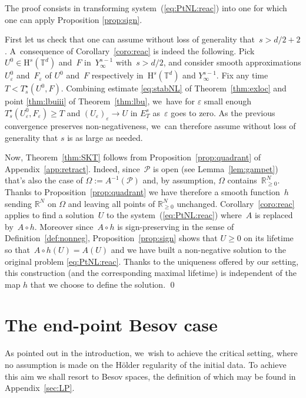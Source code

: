 \documentclass[10pt]{amsart}
\theoremstyle{definition}
\newcommand\R{\mathbb{R}}
\newcommand\T{\mathbb{T}}
\renewcommand\H{\mathrm{H}}
\let\ep\varepsilon
\begin{document}
The proof consists in transforming system~(\ref{eq:PtNL:reac}) into one for which one can apply Proposition \ref{prop:sign}.

First let us check that one can assume without loss of generality that~$s>d/2+2$. A~consequence of Corollary~\ref{coro:reac} is indeed the following. Pick~$U^0\in\H^s(\T^d)$ and~$F$ in~$Y_\infty^{s-1}$ with~$s>d/2$, and consider smooth approximations $U^0_\ep$ and~$F_\ep$ of $U^0$ and~$F$ respectively in~$\H^s(\T^d)$ and $Y_\infty^{s-1}$. Fix any time~$T<T_s^\star(U^0,F)$. Combining estimate \eqref{eq:stabNL} of Theorem~\ref{thm:exloc} and point \eqref{thm:lbuiii} of Theorem~\ref{thm:lbu}, we~have for $\ep$ small enough $T_s^\star(U^0_\ep,F_\ep) \geq T$ and $(U_\ep)_\ep\to U$ in $E_T^s$ as~$\ep$ goes to zero. As the previous convergence preserves non-negativeness, we~can therefore assume without loss of generality that $s$ is as large as needed.

Now, Theorem~\ref{thm:SKT} follows from Proposition~\ref{prop:quadrant} of Appendix~\ref{app:retract}. Indeed, since~$\mathscr{P}$ is open (see Lemma~\ref{lem:gampet}) that's also the case of $\Omega:= A^{-1}(\mathscr{P})$ and, by assumption, $\Omega$ contains~$\R_{\geq 0}^N$. Thanks to Proposition~\ref{prop:quadrant} we have therefore a smooth function~$h$ sending $\R^N$ on $\Omega$ and leaving all points of $\R_{\geq 0}^N$ unchanged. Corollary~\ref{coro:reac} applies to find a solution~$U$ to the system~(\ref{eq:PtNL:reac}) where~$A$ is replaced by~$A\circ h$. Moreover since~$A\circ h$ is sign-preserving in the sense of Definition~\ref{def:nonneg}, Proposition~\ref{prop:sign} shows that $U\geq 0$ on its lifetime so that~$A\circ h(U) = A(U)$ and we have built a non-negative solution to the original problem \eqref{eq:PtNL:reac}. Thanks to the uniqueness offered by our setting, this construction (and the corresponding maximal lifetime) is independent of the map $h$ that we choose to define the solution.
\qed

\section{The end-point Besov case}
\label{end-point Besov}
As pointed out in the introduction, we~wish to achieve the critical setting, where no assumption is made on the H\"older regularity of the initial data. To achieve this aim we shall resort to Besov spaces, the definition of which may be found in Appendix~\ref{sec:LP}.
\end{document}
